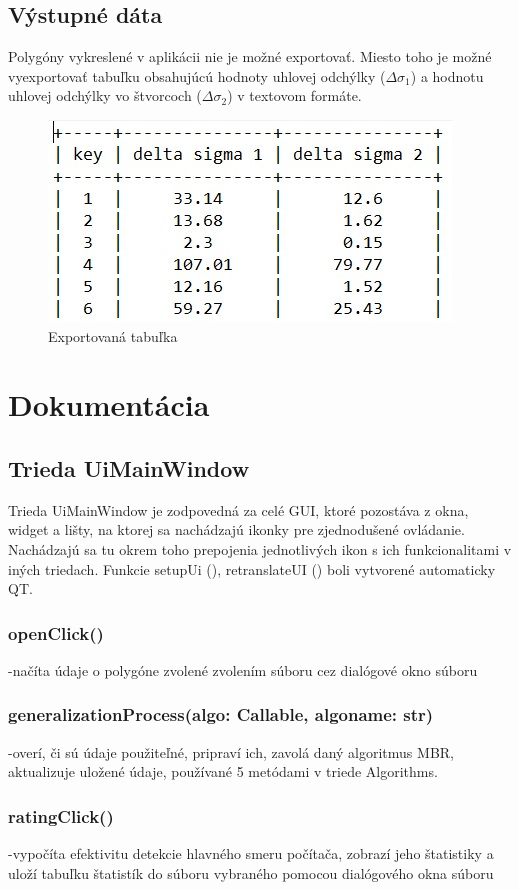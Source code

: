 \documentclass[12pt]{article}
\begin{document}
\subsection*{Výstupné dáta}
Polygóny vykreslené v aplikácii nie je možné exportovať. Miesto toho je možné vyexportovať tabuľku obsahujúcú hodnoty uhlovej odchýlky ($\Delta\sigma_{1}$) a hodnotu uhlovej odchýlky vo štvorcoch ($\Delta\sigma_{2}$) v textovom formáte. 
\begin{figure}[h]
    \centering
    \includegraphics[width=0.5\linewidth]{latex/image/tabulka.jpg}
    \caption{Exportovaná tabuľka}
    \label{fig:enter-label}
\end{figure}
\newpage
\section*{Dokumentácia}
\subsection*{Trieda Ui\textunderscore MainWindow}
Trieda UiMainWindow je zodpovedná za celé GUI, ktoré pozostáva z okna, widget
a lišty, na ktorej sa nachádzajú ikonky pre zjednodušené ovládanie. Nachádzajú sa tu okrem toho prepojenia jednotlivých ikon s ich funkcionalitami v iných triedach. Funkcie setupUi (), retranslateUI () boli vytvorené automaticky QT.
\subsubsection*{openClick()}
\noindent-načíta údaje o polygóne zvolené zvolením súboru cez dialógové okno súboru
\subsubsection*{generalizationProcess(algo: Callable, algo\textunderscore name: str)}
\noindent-overí, či sú údaje použiteľné, pripraví ich, zavolá daný algoritmus MBR, aktualizuje uložené údaje, používané 5 metódami v triede Algorithms.

\subsubsection*{ratingClick()}
\noindent-vypočíta efektivitu detekcie hlavného smeru počítača, zobrazí jeho štatistiky a uloží tabuľku štatistík do súboru vybraného pomocou dialógového okna súboru
\end{document}
